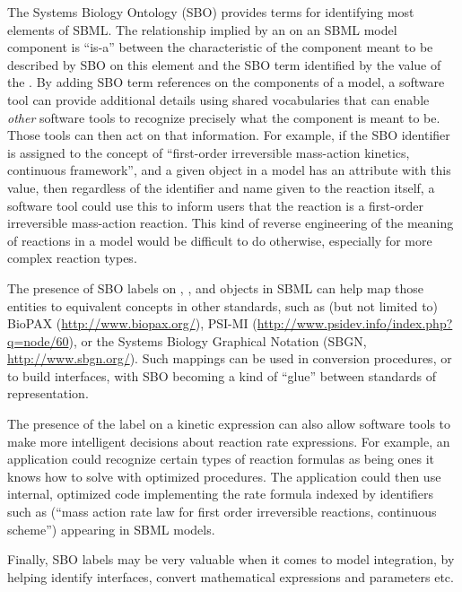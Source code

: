 The Systems Biology Ontology (SBO) provides terms for identifying
most elements of SBML.  The relationship implied by an
 on an SBML model component is ``is-a'' between the
characteristic of the component meant to be described by SBO on
this element and the SBO term identified by the value of the
.  By adding SBO term references on the components
of a model, a software tool can provide additional details using
shared vocabularies that can enable \emph{other} software tools to
recognize precisely what the component is meant to be.  Those
tools can then act on that information.  For example, if the SBO
identifier  is assigned to the concept of
``first-order irreversible mass-action kinetics, continuous
framework'', and a given \KineticLaw object in a model has an
 attribute with this value, then regardless of the
identifier and name given to the reaction itself, a software tool
could use this to inform users that the reaction is a first-order
irreversible mass-action reaction.  This kind of reverse
engineering of the meaning of reactions in a model would be
difficult to do otherwise, especially for more complex reaction
types.

The presence of SBO labels on \Compartment, \Species, and
\Reaction objects in SBML can help map those entities to
equivalent concepts in other standards, such as (but not limited
to) BioPAX (\url{http://www.biopax.org/}), PSI-MI
(\url{http://www.psidev.info/index.php?q=node/60}), or the Systems
Biology Graphical Notation (SBGN, \url{http://www.sbgn.org/}).
Such mappings can be used in conversion procedures, or to build
interfaces, with SBO becoming a kind of ``glue'' between standards
of representation.

The presence of the label on a kinetic expression can also allow
software tools to make more intelligent decisions about reaction
rate expressions.  For example, an application could recognize
certain types of reaction formulas as being ones it
knows how to solve with optimized procedures.  The application
could then use internal, optimized code implementing the rate
formula indexed by identifiers such as 
(``mass action rate law for first order irreversible reactions,
continuous scheme'') appearing in SBML models.

Finally, SBO labels may be very valuable when it comes to model
integration, by helping identify interfaces, convert mathematical
expressions and parameters etc.

